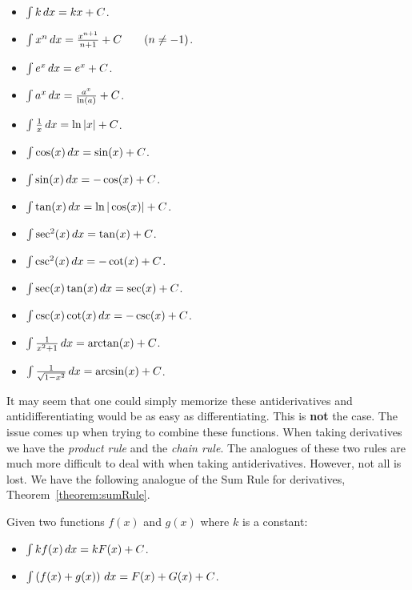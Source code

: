 \begin{fullwidth}
\begin{mainTheorem}\label{theorem:basicAnti} \hfil
\begin{multicols}{3}
\begin{itemize}
\item $\int k \, d x= kx+C$.
\item $\int x^n \, d x= \frac{x^{n+1}}{n+1}+C\qquad(n\ne-1)$.
\item $\int e^x \, d x= e^x + C$.
\item $\int a^x \, d x= \frac{a^x}{\ln(a)}+C$.
\item $\int \frac{1}{x} \, d x= \ln|x|+C$.
\item $\int \cos(x) \, d x = \sin(x) + C$.
\item $\int \sin(x) \, d x = -\cos(x) + C$.  
\item $\int \tan(x) \, d x = \ln|\cos(x)| + C$.  
\item $\int \sec^2(x) \, d x = \tan(x) + C$. 
\item $\int \csc^2(x) \, d x = -\cot(x) + C$.
\item $\int \sec(x)\tan(x) \, d x = \sec(x) + C$.
\item $\int \csc(x)\cot(x) \, d x = -\csc(x) + C$.
\item $\int \frac{1}{x^2+1}\, d x = \arctan(x) + C$.
\item $\int \frac{1}{\sqrt{1-x^2}}\, d x= \arcsin(x)+C$.
\end{itemize}
\end{multicols}
\end{mainTheorem}
\end{fullwidth}
It may seem that one could simply memorize these antiderivatives and
antidifferentiating would be as easy as differentiating. This is
\textbf{not} the case. The issue comes up when trying to combine these
functions.  When taking derivatives we have the \textit{product rule}
and the \textit{chain rule}. The analogues of these two rules are much
more difficult to deal with when taking antiderivatives. However, not
all is lost. We have the following analogue of the Sum Rule for
derivatives, Theorem~\ref{theorem:sumRule}.

\begin{mainTheorem}\label{theorem:SRA}
Given two functions $f(x)$ and $g(x)$ where $k$ is a constant:
\begin{itemize}
\item $\int k f(x) \, d x= kF(x) + C$.
\item $\int \left(f(x) + g(x)\right) \, d x = F(x) + G(x) + C$.
\end{itemize}
\end{mainTheorem}

